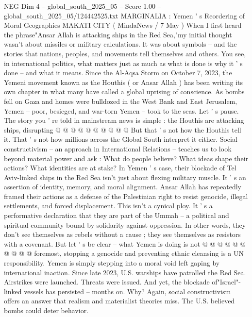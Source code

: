 \begin{textsample}{NEG Dim 4 – global\_south\_2025\_05 – Score 1.00 – global\_south\_2025\_05/124442525.txt}  \label{ex:f4_neg_368}
MARGINALIA : Yemen ' s Reordering of Moral Geographies MAKATI CITY ( MindaNews / 7 May ) When I first heard the phrase"Ansar Allah is attacking ships in the Red Sea,"my initial thought wasn't about missiles or military calculations.
It was about symbols -- and the stories that nations, peoples, and movements tell themselves and others.
You see, in international politics, what matters just as much as what is done is why it ' s done -- and what it means.
Since the Al-Aqsa Storm on October 7, 2023, the Yemeni movement known as the Houthis ( or Ansar Allah ) has been writing its own chapter in what many have called a global uprising of conscience.
As bombs fell on Gaza and homes were bulldozed in the West Bank and East Jerusalem, Yemen -- poor, besieged, and war-torn Yemen -- took to the seas.
Let ' s pause.
The story you ' re told in mainstream news is simple : the Houthis are attacking ships, disrupting @ @ @ @ @ @ @ @ @ @ But that ' s not how the Houthis tell it.
That ' s not how millions across the Global South interpret it either.
Social constructivism -- an approach in International Relations -- teaches us to look beyond material power and ask : What do people believe?
What ideas shape their actions?
What identities are at stake?
In Yemen ' s case, their blockade of Tel Aviv-linked ships in the Red Sea isn't just about flexing military muscle.
It ' s an assertion of identity, memory, and moral alignment.
Ansar Allah has repeatedly framed their actions as a defense of the Palestinian right to resist genocide, illegal settlements, and forced displacement.
This isn't a cynical ploy.
It ' s a performative declaration that they are part of the Ummah -- a political and spiritual community bound by solidarity against oppression.
In other words, they don't see themselves as rebels without a cause ; they see themselves as resistors with a covenant.
But let ' s be clear -- what Yemen is doing is not @ @ @ @ @ @ @ @ @ @ foremost, stopping a genocide and preventing ethnic cleansing is a UN responsibility.
Yemen is simply stepping into a moral void left gaping by international inaction.
Since late 2023, U.S. warships have patrolled the Red Sea.
Airstrikes were launched.
Threats were issued.
And yet, the blockade of"Israel"-linked vessels has persisted -- months on.
Why?
Again, social constructivism offers an answer that realism and materialist theories miss.
The U.S. believed bombs could deter behavior.

\end{textsample}

